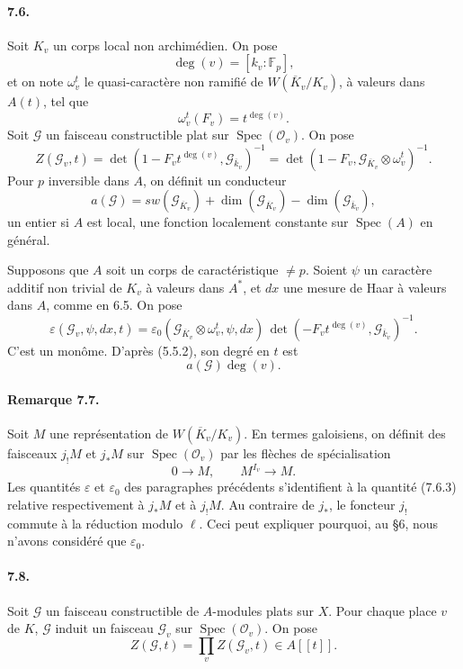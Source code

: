 \documentclass[10pt]{article}
\newcommand{\F}{\mathbb F}
\newcommand{\Spec}{\operatorname{Spec}}
\providecommand{\Spec}{\operatorname{Spec}}
\providecommand{\Spec}{\operatorname{Spec}}
\providecommand{\Spec}{\operatorname{Spec}}
\begin{document}
\paragraph{7.6.} Soit \(K_v\) un corps local non archimédien. On pose
\[
\deg(v)=[k_v:\F_p],
\]
et on note \(\omega_v^t\) le quasi-caractère non ramifié de \(W(\overline K_v/K_v)\), à valeurs dans \(A(t)\), tel que
\[
\omega_v^t(F_v)=t^{\deg(v)}.
\]
Soit \(\mathcal G\) un faisceau constructible plat sur \(\Spec(\mathcal O_v)\). On pose
\[
\tag{7.6.1}
Z(\mathcal G_v,t)
=
\det(1-F_vt^{\deg(v)},\mathcal G_{\overline k_v})^{-1}
=
\det(1-F_v,\mathcal G_{\overline K_v}\otimes\omega_v^t)^{-1}.
\]
Pour \(p\) inversible dans \(A\), on définit un conducteur
\[
\tag{7.6.2}
a(\mathcal G)=sw(\mathcal G_{\overline K_v})+
\dim(\mathcal G_{\overline K_v})-\dim(\mathcal G_{\overline k_v}),
\]
un entier si \(A\) est local, une fonction localement constante sur \(\Spec(A)\) en général.

Supposons que \(A\) soit un corps de caractéristique \(\ne p\). Soient \(\psi\) un caractère additif non trivial de \(K_v\) à valeurs dans \(A^*\), et \(dx\) une mesure de Haar à valeurs dans \(A\), comme en 6.5. On pose
\[
\tag{7.6.3}
\varepsilon(\mathcal G_v,\psi,dx,t)
=
\varepsilon_0(\mathcal G_{\overline K_v}\otimes\omega_v^t,\psi,dx)\,
\det(-F_vt^{\deg(v)},\mathcal G_{\overline k_v})^{-1}.
\]
C'est un monôme. D'après (5.5.2), son degré en \(t\) est
\[
a(\mathcal G)\deg(v).
\]

\paragraph{Remarque 7.7.} Soit \(M\) une représentation de \(W(\overline K_v/K_v)\). En termes galoisiens, on définit des faisceaux \(j_!M\) et \(j_*M\) sur \(\Spec(\mathcal O_v)\) par les flèches de spécialisation
\[
0\longrightarrow M,
\qquad
M^{I_v}\longrightarrow M.
\]
Les quantités \(\varepsilon\) et \(\varepsilon_0\) des paragraphes précédents s'identifient à la quantité (7.6.3) relative respectivement à \(j_*M\) et à \(j_!M\). Au contraire de \(j_*\), le foncteur \(j_!\) commute à la réduction modulo \(\ell\). Ceci peut expliquer pourquoi, au §6, nous n'avons considéré que \(\varepsilon_0\).

\paragraph{7.8.} Soit \(\mathcal G\) un faisceau constructible de \(A\)-modules plats sur \(X\). Pour chaque place \(v\) de \(K\), \(\mathcal G\) induit un faisceau \(\mathcal G_v\) sur \(\Spec(\mathcal O_v)\). On pose
\[
\tag{7.8.1}
Z(\mathcal G,t)=\prod_v Z(\mathcal G_v,t)\in A[[t]].
\]
\end{document}
